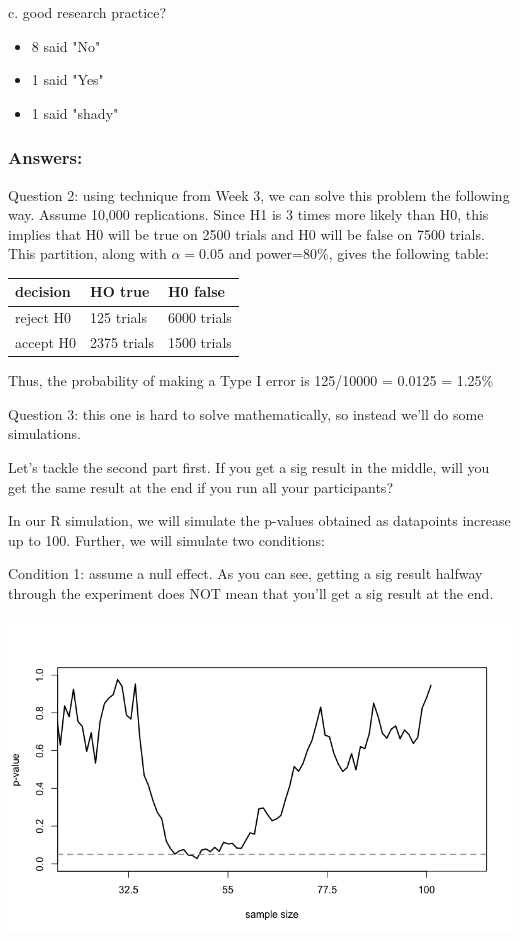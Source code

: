 \documentclass[11pt]{article}
\begin{document}
c. good research practice?
\begin{itemize}
\item 8 said "No"
\item 1 said "Yes"
\item 1 said "shady"
\end{itemize}

\subsubsection*{Answers:}
\label{sec-1-0-3}

Question 2:  using technique from Week 3, we can solve this problem the following way.  Assume 10,000 replications.  Since H1 is 3 times more likely than H0, this implies that H0 will be true on 2500 trials and H0 will be false on 7500 trials.  This partition, along with $\alpha=0.05$ and power=80\%, gives the following table:

\begin{center}
\begin{tabular}{lll}
decision & HO true & H0 false\\
\hline
reject H0 & 125 trials & 6000 trials\\
accept H0 & 2375 trials & 1500 trials\\
\end{tabular}
\end{center}

Thus, the probability of making a Type I error is 125/10000 = 0.0125 = 1.25\%

Question 3: this one is hard to solve mathematically, so instead we'll do some simulations.

Let's tackle the second part first.  If you get a sig result in the middle, will you get the same result at the end if you run all your participants?  

In our R simulation, we will simulate the p-values obtained as datapoints increase up to 100.  Further, we will simulate two conditions:

Condition 1: assume a null effect.  As you can see, getting a sig result halfway through the experiment does NOT mean that you'll get a sig result at the end.

\includegraphics[width=.9\linewidth]{figures/pValues-nullEffect.png}
\end{document}
